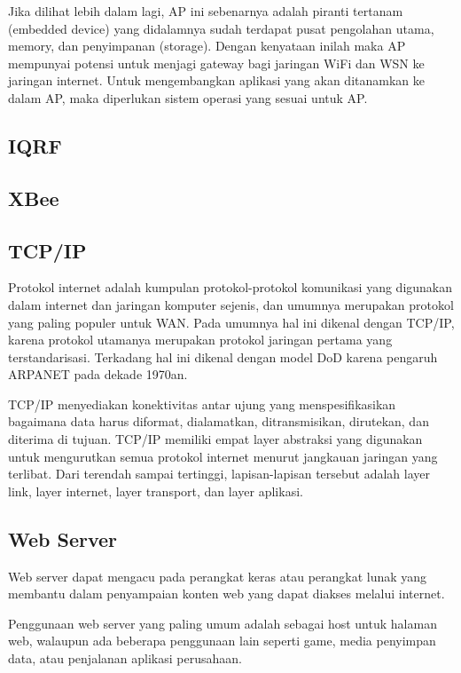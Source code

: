     Jika dilihat lebih dalam lagi, AP ini sebenarnya adalah piranti tertanam (embedded device) yang didalamnya sudah terdapat pusat pengolahan utama, memory, dan penyimpanan (storage). Dengan kenyataan inilah maka AP mempunyai potensi untuk menjagi gateway bagi jaringan WiFi dan WSN ke jaringan internet. Untuk mengembangkan aplikasi yang akan ditanamkan ke dalam AP, maka diperlukan sistem operasi yang sesuai untuk AP.

  \subsection{IQRF}


  \subsection{XBee}
    

  \subsection{TCP/IP}
    Protokol internet adalah kumpulan protokol-protokol komunikasi yang digunakan dalam internet dan jaringan komputer sejenis, dan umumnya merupakan protokol yang paling populer untuk WAN. Pada umumnya hal ini dikenal dengan TCP/IP, karena protokol utamanya merupakan protokol jaringan pertama yang terstandarisasi. Terkadang hal ini dikenal dengan model DoD karena pengaruh ARPANET pada dekade 1970an.

    TCP/IP menyediakan konektivitas antar ujung yang menspesifikasikan bagaimana data harus diformat, dialamatkan, ditransmisikan, dirutekan, dan diterima di tujuan. TCP/IP memiliki empat layer abstraksi yang digunakan untuk mengurutkan semua protokol internet menurut jangkauan jaringan yang terlibat. Dari terendah sampai tertinggi, lapisan-lapisan tersebut adalah layer link, layer internet, layer transport, dan layer aplikasi.


  \subsection{Web Server}
    Web server dapat mengacu pada perangkat keras atau perangkat lunak yang membantu dalam penyampaian konten web yang dapat diakses melalui internet.

    Penggunaan web server yang paling umum adalah sebagai host untuk halaman web, walaupun ada beberapa penggunaan lain seperti game, media penyimpan data, atau penjalanan aplikasi perusahaan.


